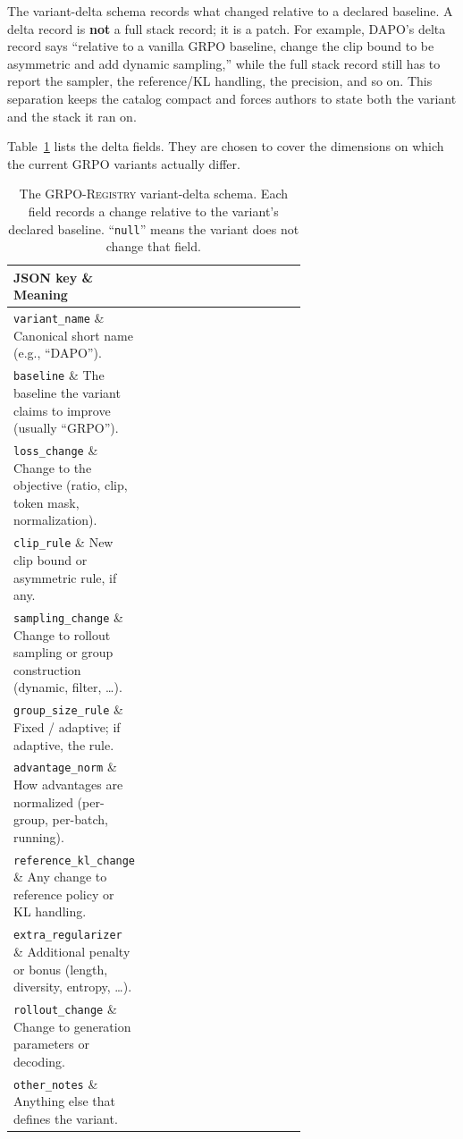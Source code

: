 \documentclass[11pt]{article}
\newcommand{\grpo}{\textsc{GRPO}}
\newcommand{\grpoReg}{\textsc{GRPO-Registry}}
\begin{document}
The variant-delta schema records what changed relative to a declared baseline.
A delta record is \textbf{not} a full stack record; it is a patch. For example,
DAPO's delta record says ``relative to a vanilla \grpo{} baseline, change the
clip bound to be asymmetric and add dynamic sampling,'' while the full stack
record still has to report the sampler, the reference/KL handling, the
precision, and so on. This separation keeps the catalog compact and forces
authors to state both the variant and the stack it ran on.

Table~\ref{tab:delta-schema} lists the delta fields. They are chosen to cover
the dimensions on which the current \grpo{} variants actually differ.

\begin{table}[t]
\centering
\caption{The \grpoReg{} variant-delta schema. Each field records a change
  relative to the variant's declared baseline. ``\texttt{null}'' means the
  variant does not change that field.}
\label{tab:delta-schema}
\small
\begin{tabular}{@{}lp{0.65\linewidth}@{}}
\toprule
\textbf{JSON key} \& \textbf{Meaning}\\
\midrule
\texttt{variant\_name} \& Canonical short name (e.g., ``DAPO'').\\
\texttt{baseline} \& The baseline the variant claims to improve (usually
  ``GRPO'').\\
\texttt{loss\_change} \& Change to the objective (ratio, clip, token mask,
  normalization).\\
\texttt{clip\_rule} \& New clip bound or asymmetric rule, if any.\\
\texttt{sampling\_change} \& Change to rollout sampling or group construction
  (dynamic, filter, \ldots).\\
\texttt{group\_size\_rule} \& Fixed / adaptive; if adaptive, the rule.\\
\texttt{advantage\_norm} \& How advantages are normalized (per-group,
  per-batch, running).\\
\texttt{reference\_kl\_change} \& Any change to reference policy or KL handling.\\
\texttt{extra\_regularizer} \& Additional penalty or bonus (length, diversity,
  entropy, \ldots).\\
\texttt{rollout\_change} \& Change to generation parameters or decoding.\\
\texttt{other\_notes} \& Anything else that defines the variant.\\
\bottomrule
\end{tabular}
\end{table}
\end{document}
